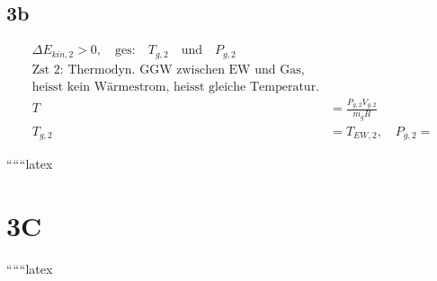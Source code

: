 

\subsection*{3b}
\begin{align*}
\Delta E_{kin,2} > 0, \quad \text{ges:} \quad T_{g,2} \quad \text{und} \quad P_{g,2} \\
\text{Zst 2: Thermodyn. GGW zwischen EW und Gas,} \\
\text{heisst kein Wärmestrom, heisst gleiche Temperatur.} \\
T &= \frac{P_{g,2} V_{g,2}}{m_{g} R} \\
T_{g,2} &= T_{EW,2}, \quad P_{g,2} = 
\end{align*}

``````latex


\section*{3C}

``````latex